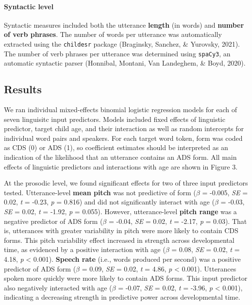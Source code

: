 \documentclass[10pt, letterpaper]{article}
\begin{document}
\hypertarget{syntactic-level}{%
\paragraph{Syntactic level}\label{syntactic-level}}

Syntactic measures included both the utterance \textbf{length} (in
words) and \textbf{number of verb phrases}. The number of words per
utterance was automatically extracted using the \texttt{childesr}
package (Braginsky, Sanchez, \& Yurovsky, 2021). The number of verb
phrases per utterance was determined using \texttt{spaCy3}, an automatic
syntactic parser (Honnibal, Montani, Van Landeghem, \& Boyd, 2020).

\hypertarget{results-1}{%
\subsection{Results}\label{results-1}}

We ran individual mixed-effects binomial logistic regression models for
each of seven linguisitc input predictors. Models included fixed effects
of linguistic predictor, target child age, and their interaction as well
as random intercepts for individual word pairs and speakers. For each
target word token, form was coded as CDS (0) or ADS (1), so coefficient
estimates should be interpreted as an indication of the likelihood that
an utterance contains an ADS form. All main effects of linguistic
predictors and interactions with age are shown in Figure 3.

At the prosodic level, we found significant effects for two of three
input predictors tested. Utterance-level \textbf{mean pitch} was not
predictive of form (\(\beta\) = -0.005, \emph{SE} = 0.02, \emph{t} =
-0.23, \emph{p} = 0.816) and did not significantly interact with age
(\(\beta\) = -0.03, \emph{SE} = 0.02, \emph{t} = -1.92, \emph{p} =
0.055). However, utterance-level \textbf{pitch range} was a negative
predictor of ADS form (\(\beta\) = -0.04, \emph{SE} = 0.02, \emph{t} =
-2.17, \emph{p} = 0.03). That is, utterances with greater variability in
pitch were more likely to contain CDS forms. This pitch variability
effect increased in strength across developmental time, as evidenced by
a positive interaction with age (\(\beta\) = 0.08, \emph{SE} = 0.02,
\emph{t} = 4.18, \emph{p} \textless{} 0.001). \textbf{Speech rate}
(i.e., words produced per second) was a positive predictor of ADS form
(\(\beta\) = 0.09, \emph{SE} = 0.02, \emph{t} = 4.86, \emph{p}
\textless{} 0.001). Utterances spoken more quickly were more likely to
contain ADS forms. This input predictor also negatively interacted with
age (\(\beta\) = -0.07, \emph{SE} = 0.02, \emph{t} = -3.96, \emph{p}
\textless{} 0.001), indicating a decreasing strength in predictive power
across developmental time.
\end{document}
